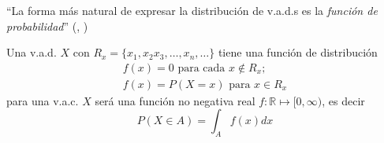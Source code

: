 \begin{displayquote}
``La forma más natural de expresar la distribución de v.a.d.s es la \emph{función de probabilidad}'' (\citeauthor{blitz19}, \citeyear{blitz19})
\end{displayquote}
Una v.a.d. $X$ con $R_x=\{x_1,x_2x_3,\ldots,x_n,\ldots\}$ tiene una función de distribución
\begin{equation}
\begin{matrix}
f(x)=0\text{ para cada }x \notin R_x\text{;}\\
f(x)=P(X=x)\text{ para } x\in R_x
\end{matrix}\label{eq:FP}
\end{equation}
para una v.a.c. $X$ será una función no negativa real $f:\mathbb{R}\mapsto[0,\infty)$, es decir
\begin{equation}
P(X\in A)=\int_{A}f(x)dx
\end{equation}

